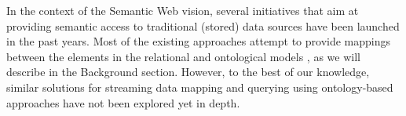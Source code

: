 In the context of the Semantic Web vision, several initiatives that aim at providing semantic access to traditional
(stored) data sources have been launched in the past years. Most of the existing approaches attempt to provide mappings
between the elements in the relational and ontological models \cite{Sahoo_09}, as we will describe in the Background section.%
However, to the best of our knowledge, similar solutions for streaming data mapping and querying
using ontology-based approaches have not been explored yet in depth.

